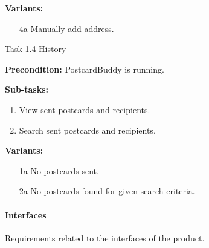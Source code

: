 \documentclass[10pt,a4paper]{article}
\begin{document}
\begin {description}
\begin {description}
\item \textbf{Variants:}
\begin{itemize}[label={}]

\item[4a] Manually add address.
\end{itemize}
\end{description}


\item [Task 1.4] History

\begin {description}
\item \textbf{Precondition:} PostcardBuddy is running. 

\item \textbf{Sub-tasks:}
\begin{enumerate}
\item View sent postcards and recipients. 
\item Search sent postcards and recipients.

\end{enumerate}
\item \textbf{Variants:}
\begin{itemize}[label={}]

\item[1a] No postcards sent. 
\item[2a] No postcards found for given search criteria. 

\end{itemize}
\end{description}
\end{description}



\paragraph{Interfaces}
Requirements related to the interfaces of the product.
\end{document}
